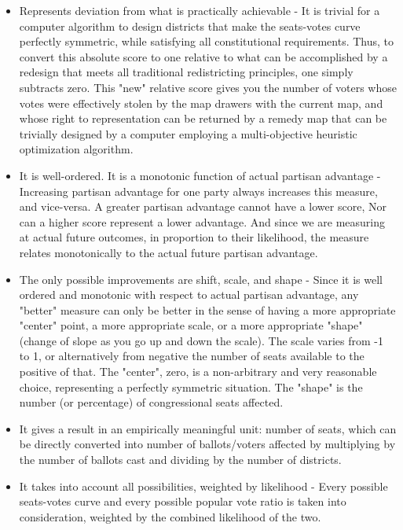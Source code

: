 \documentclass[preprint,12pt]{article}
\begin{document}
\begin{itemize}
\item Represents deviation from what is practically achievable - It is trivial for a computer algorithm to design districts that make the seats-votes curve perfectly symmetric, while satisfying all constitutional requirements.  Thus, to convert this absolute score to one relative to what can be accomplished by a redesign that meets all traditional redistricting principles, one simply subtracts zero.  This "new" relative score gives you the number of voters whose votes were effectively stolen by the map drawers with the current map, and whose right to representation can be returned by a remedy map that can be trivially designed by a computer employing a multi-objective heuristic optimization algorithm.

\item It is well-ordered.  It is a monotonic function of actual partisan advantage - Increasing partisan advantage for one party always increases this measure, and vice-versa.  A greater partisan advantage cannot have a lower score, Nor can a higher score represent a lower advantage.  And since we are measuring at actual future outcomes, in proportion to their likelihood, the measure relates monotonically to the actual future partisan advantage.
 
\item The only possible improvements are shift, scale, and shape - Since it is well ordered and monotonic with respect to actual partisan advantage, any "better" measure can only be better in the sense of having a more appropriate "center" point, a more appropriate scale, or a more appropriate "shape" (change of slope as you go up and down the scale).  The scale varies from -1 to 1, or alternatively from negative the number of seats available to the positive of that.  The "center",  zero, is a non-arbitrary and very reasonable choice, representing a perfectly symmetric situation.   The "shape" is the number (or percentage) of congressional seats affected.

\item It gives a result in an empirically meaningful unit: number of seats, which can be directly converted into number of ballots/voters affected by multiplying by the number of ballots cast and dividing by the number of districts.
 
\item It takes into account all possibilities, weighted by likelihood - Every possible seats-votes curve and every possible popular vote ratio is taken into consideration, weighted by the combined likelihood of the two.
 
\end{itemize}
\end{document}
